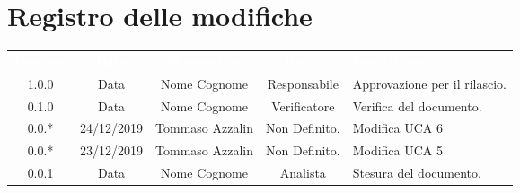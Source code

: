 \section*{Registro delle modifiche}
{
\renewcommand{\arraystretch}{1.5}
\centering
\begin{longtable}{ c c  c  c C{4cm}}
\textcolor{white}{\textbf{Versione}} & \textcolor{white}{\textbf{Data}} & \textcolor{white}{\textbf{Nominativo}} & \textcolor{white}{\textbf{Ruolo}} & \textcolor{white}{\textbf{Descrizione}}\\	


1.0.0 & Data & Nome Cognome & Responsabile & Approvazione per il rilascio.  \\
		
0.1.0 & Data & Nome Cognome & Verificatore & Verifica del documento.  \\

0.0.* & 24/12/2019 & Tommaso Azzalin & Non Definito. & Modifica UCA 6\\

0.0.* & 23/12/2019 & Tommaso Azzalin & Non Definito. & Modifica UCA 5\\

0.0.1 & Data & Nome Cognome & Analista & Stesura del documento.  \\
		
		
\end{longtable}
}